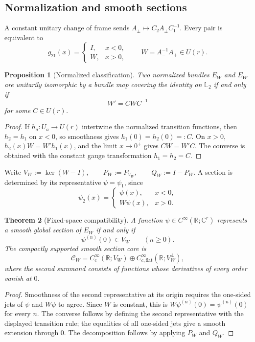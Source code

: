 \documentclass[11pt]{article}
\theoremstyle{plain}
\newtheorem{theorem}{Theorem}[section]
\newtheorem{proposition}[theorem]{Proposition}
\theoremstyle{definition}
\newcommand{\R}{\mathbb{R}}
\newcommand{\C}{\mathbb{C}}
\newcommand{\Ltwo}{\mathbb{L}_{2}}
\begin{document}
\subsection{Normalization and smooth sections}

A constant unitary change of frame sends
\(A_\pm\longmapsto C_2A_\pm C_1^{-1}\).
Every pair is equivalent to
\[
g_{21}(x)=
\begin{cases}
I,&x<0,\\
W,&x>0,
\end{cases}
\qquad
W=A_-^{-1}A_+\in U(r).
\]

\begin{proposition}[Normalized classification]
\label{prop:unitary-L2-classification}
Two normalized bundles \(E_W\) and \(E_{W'}\) are unitarily isomorphic by a bundle map covering the identity on \(\Ltwo\) if and only if
\[
W'=CWC^{-1}
\]
for some \(C\in U(r)\).
\end{proposition}

\begin{proof}
If \(h_a:U_a\to U(r)\) intertwine the normalized transition functions, then
\(h_2=h_1\) on \(x<0\), so smoothness gives
\(h_1(0)=h_2(0)=:C\). On \(x>0\),
\(h_2(x)W=W'h_1(x)\),
and the limit \(x\to0^+\) gives \(CW=W'C\). The converse is obtained with the constant gauge transformation \(h_1=h_2=C\).
\end{proof}

Write
\(V_W:=\ker(W-I), \qquad P_W:=P_{V_W}, \qquad Q_W:=I-P_W\).
A section is determined by its representative \(\psi=\psi_1\), since
\[
\psi_2(x)=
\begin{cases}
\psi(x),&x<0,\\
W\psi(x),&x>0.
\end{cases}
\]

\begin{theorem}[Fixed-space compatibility]
\label{thm:unitary-L2-fixed}
A function \(\psi\in C^\infty(\R;\C^r)\) represents a smooth global section of \(E_W\) if and only if
\[
\psi^{(n)}(0)\in V_W
\qquad(n\geq0).
\]
The compactly supported smooth section core is
\[
\mathcal C_W
=
C_c^\infty(\R;V_W)
\oplus
C_{c,\mathrm{flat}}^\infty(\R;V_W^\perp),
\]
where the second summand consists of functions whose derivatives of every order vanish at \(0\).
\end{theorem}

\begin{proof}
Smoothness of the second representative at its origin requires the one-sided jets of
\(\psi\) and \(W\psi\) to agree. Since \(W\) is constant, this is \(W\psi^{(n)}(0)=\psi^{(n)}(0)\) for every \(n\). The converse follows by defining the second representative with the displayed transition rule; the equalities of all one-sided jets give a smooth extension through \(0\). The decomposition follows by applying \(P_W\) and \(Q_W\).
\end{proof}
\end{document}
